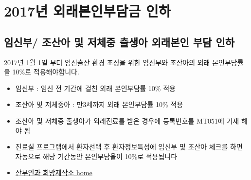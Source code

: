 \section{2017년 외래본인부담금 인하}
\subsection{임신부/ 조산아 및 저체중 출생아 외래본인 부담 인하}
2017년 1월 1일 부터 임신\cntrdot{}출산 환경 조성을 위한 임신부와 조산아의 외래 본인부담률을 10\%로 적용해야합니다. 
\begin{itemize}\tightlist
\item 임신부 : 임신 전 기간에 걸친 외래 본인부담률 10\% 적용
\item 조산아 및 저체중아 : 만3세까지 외래 본인부담률 10\% 적용 
\item 조산아 및 저체중 출생아가 외래진료를 받은 경우에 등록번호를 MT051에 기재 해야 됨
\item 진료실 프로그램에서 환자선택 후 환자정보특성에 임신부 및 조산아 체크를 하면 자동으로 해당 기간동안 본인부담율이 10\%로 적용됩니다 
\item \href{http://www.obgydoctor.co.kr/xe/index.php?document_srl=25045&mid=m_faq}{산부인과 희망제작소 home}
\end{itemize}
\prezi{\clearpage}
